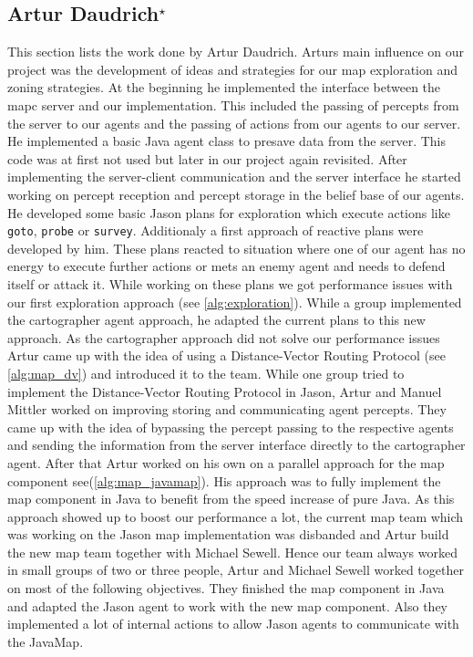 \subsection[Artur Daudrich]{Artur Daudrich$^{\star}$}
This section lists the work done by Artur Daudrich.
Arturs main influence on our project was the development of ideas and strategies for our map exploration and zoning strategies. At the beginning he implemented the interface between the mapc server and our implementation. This included the passing of percepts from the server to our agents and the passing of actions from our agents to our server. He implemented a basic Java agent class to presave data from the server. This code was at first not used but later in our project again revisited. After implementing the server-client communication and the server interface he started working on percept reception and percept storage in the belief base of our agents. 
He developed some basic Jason plans for exploration which execute actions like \texttt{goto}, \texttt{probe} or \texttt{survey}. Additionaly a first approach of reactive plans were developed by him. These plans reacted to situation where one of our agent has no energy to execute further actions or mets an enemy agent and needs to defend itself or attack it. While working on these plans we got performance issues with our first exploration approach (see \autoref{alg:exploration}). While a group implemented the cartographer agent approach, he adapted the current plans to this new approach. As the cartographer approach did not solve our performance issues Artur came up with the idea of using a Distance-Vector Routing Protocol (see \autoref{alg:map_dv}) and introduced it to the team. While one group tried to implement the Distance-Vector Routing Protocol in Jason, Artur and Manuel Mittler worked on improving storing and communicating agent percepts. They came up with the idea of bypassing the percept passing to the respective agents and sending the information from the server interface directly to the cartographer agent. 
After that Artur worked on his own on a parallel approach for the map component see(\autoref{alg:map_javamap}). His approach was to fully implement the map component in Java to benefit from the speed increase of pure Java. As this approach showed up to boost our performance a lot, the current map team which was working on the Jason map implementation was disbanded and Artur build the new map team together with Michael Sewell. Hence our team always worked in small groups of two or three people, Artur and Michael Sewell worked together on most of the following objectives. They finished the map component in Java and adapted the Jason agent to work with the new map component. Also they implemented a lot of internal actions to allow Jason agents to communicate with the JavaMap.

